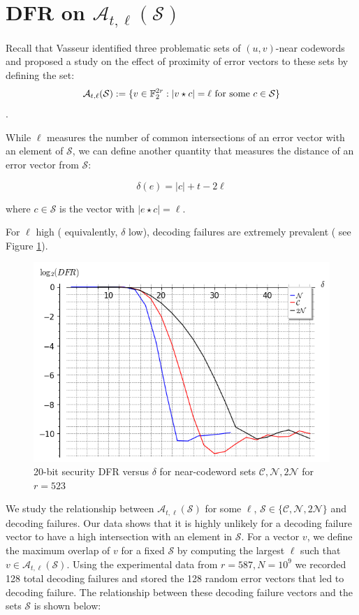 \section{DFR on $\mathcal{A}_{t,\ell}(\mathcal{S})$}

Recall that Vasseur identified three problematic sets of $(u,v)$-near codewords and proposed a study on the effect of proximity of error vectors to these sets by defining the set: $$\mathcal{A}_{t,\ell}(\mathcal{S}) := \{v \in \mathbb{F}_2^{2r} : |v \star c| = \ell \text{ for some } c \in \mathcal{S} \}$$.

While $\ell$ measures the number of common intersections of an error vector with an element of $\mathcal{S}$, we can define another quantity that measures the distance of an error vector from $\mathcal{S}$:

\[
\delta(e) = |c| + t - 2\ell
\]

where $c\in \mathcal{S}$ is the vector with $|e \star c| = \ell$.

For $\ell$ high ( equivalently, $\delta$ low), decoding failures are extremely prevalent ( see Figure \ref{fig:DFR_CN2N}).

\begin{figure}[h]
    \centering
    \includegraphics[scale=.75]{2_bike/DFR_20bit_CN2N_new.png}
    \caption{20-bit security DFR versus $\delta$ for near-codeword sets  $\mathcal{C},\mathcal{N}, 2\mathcal{N}$ for $r = 523$}
    \label{fig:DFR_CN2N}
\end{figure}

We study the relationship between $\mathcal{A}_{t,\ell}(\mathcal{S})$ for some $\ell$, $\mathcal{S} \in \{ \mathcal{C}, \mathcal{N}, 2\mathcal{N} \}$ and decoding failures. Our data shows that it is highly unlikely for a decoding failure vector to have a high intersection with an element in $\mathcal{S}$. For a vector $v$, we define the maximum overlap of $v$ for a fixed $\mathcal{S}$ by computing the largest $\ell$ such that $v \in \mathcal{A}_{t,\ell}(\mathcal{S})$. Using the experimental data from $r=587, N=10^9$ we recorded  128 total decoding failures and stored the 128 random error vectors that led to decoding failure. The relationship between these decoding failure vectors and the sets $\mathcal{S} $ is shown below:


